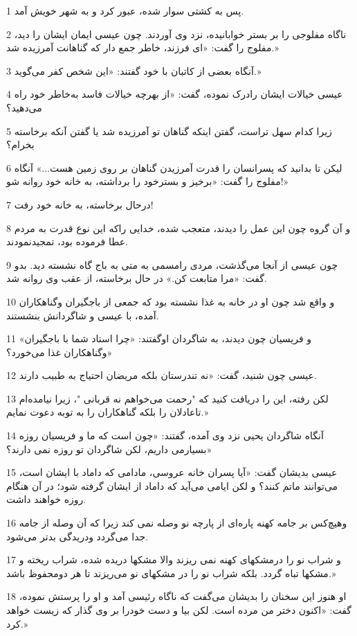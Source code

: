 \par 1 پس به کشتی سوار شده، عبور کرد و به شهر خویش آمد.
\par 2 ناگاه مفلوجی را بر بستر خوابانیده، نزد وی آوردند. چون عیسی ایمان ایشان را دید، مفلوج را گفت: «ای فرزند، خاطر جمع دار که گناهانت آمرزیده شد.»
\par 3 آنگاه بعضی از کاتبان با خود گفتند: «این شخص کفر می‌گوید.»
\par 4 عیسی خیالات ایشان رادرک نموده، گفت: «از بهر‌چه خیالات فاسد به‌خاطر خود راه می‌دهید؟
\par 5 زیرا کدام سهل تراست، گفتن اینکه گناهان تو آمرزیده شد یا گفتن آنکه برخاسته بخرام؟
\par 6 لیکن تا بدانید که پسرانسان را قدرت آمرزیدن گناهان بر روی زمین هست...» آنگاه مفلوج را گفت: «برخیز و بسترخود را برداشته، به خانه خود روانه شو!»
\par 7 درحال برخاسته، به خانه خود رفت!
\par 8 و آن گروه چون این عمل را دیدند، متعجب شده، خدایی راکه این نوع قدرت به مردم عطا فرموده بود، تمجیدنمودند.
\par 9 چون عیسی از آنجا می‌گذشت، مردی رامسمی به متی به باج گاه نشسته دید. بدو گفت: «مرا متابعت کن.» در حال برخاسته، از عقب وی روانه شد.
\par 10 و واقع شد چون او در خانه به غذا نشسته بود که جمعی از باجگیران وگناهکاران آمده، با عیسی و شاگردانش بنشستند.
\par 11 «و فریسیان چون دیدند، به شاگردان اوگفتند: «چرا استاد شما با باجگیران وگناهکاران غذا می‌خورد؟»
\par 12 عیسی چون شنید، گفت: «نه تندرستان بلکه مریضان احتیاج به طبیب دارند.
\par 13 لکن رفته، این را دریافت کنید که "رحمت می‌خواهم نه قربانی "، زیرا نیامده‌ام تاعادلان را بلکه گناهکاران را به توبه دعوت نمایم.»
\par 14 آنگاه شاگردان یحیی نزد وی آمده، گفتند: «چون است که ما و فریسیان روزه بسیارمی داریم، لکن شاگردان تو روزه نمی دارند؟»
\par 15 عیسی بدیشان گفت: «آیا پسران خانه عروسی، مادامی که داماد با ایشان است، می‌توانند ماتم کنند؟ و لکن ایامی می‌آید که داماد از ایشان گرفته شود؛ در آن هنگام روزه خواهند داشت.
\par 16 وهیچ‌کس بر جامه کهنه پاره‌ای از پارچه نو وصله نمی کند زیرا که آن وصله از جامه جدا می‌گردد ودریدگی بدتر می‌شود.
\par 17 و شراب نو را درمشکهای کهنه نمی ریزند والا مشکها دریده شده، شراب ریخته و مشکها تباه گردد. بلکه شراب نو را در مشکهای نو می‌ریزند تا هر دومحفوظ باشد.»
\par 18 او هنوز این سخنان را بدیشان می‌گفت که ناگاه رئیسی آمد و او را پرستش نموده، گفت: «اکنون دختر من مرده است. لکن بیا و دست خودرا بر وی گذار که زیست خواهد کرد.»
